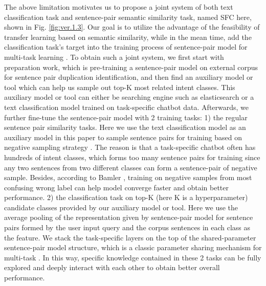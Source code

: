 \documentclass[letterpaper]{article} %
\begin{document}
  The  above  limitation  motivates  us  to  propose a joint system of both text
  classification  task  and  sentence-pair  semantic  similarity task, named SFC
  here, shown in Fig. \ref{fig:ver.1.3}. Our goal is to utilize the advantage of
  the  feasibility  of  transfer learning based on semantic similarity, while in
  the  mean time, add the classification task's target into the training process
  of            sentence-pair           model           for           multi-task
  learning \cite{caruana1993multitask,collobert2008unified}.  To  obtain  such  a
  joint  system,  we  first start with preparation work, which is pre-training a
  sentence-pair   model   on  external  corpus  for  sentence  pair  duplication
  identification,  and  then  find  an auxiliary model or tool which can help us
  sample out top-K most related intent classes. This auxiliary model or tool can
  either  be searching engine such as elasticsearch \cite{divya2013elasticsearch}
  or  a  text  classification  model  trained  on  task-specific  chatbot  data.
  Afterwards,  we  further  fine-tune  the  sentence-pair  model with 2 training
  tasks:  1)  the  regular  sentence pair similarity tasks. Here we use the text
  classification  model  as  an auxiliary model in this paper to sample sentence
  pairs       for       training       based      on      negative      sampling
  strategy \cite{bamler2020extreme}.  The  reason is that a task-specific chatbot
  often  has hundreds of intent classes, which forms too many sentence pairs for
  training  since  any  two  sentences  from  two  different  classes can form a
  sentence-pair     of     negative     sample.     Besides,     according    to
  Bamler \cite{bamler2020extreme},   training   on  negative  samples  from  most
  confusing  wrong  label  can  help  model  converge  faster  and obtain better
  performance.  2) the classification task on top-K (here K is a hyperparameter)
  candidate  classes  provided  by  our auxiliary model or tool. Here we use the
  average  pooling  of  the  representation  given  by  sentence-pair  model for
  sentence pairs formed by the user input query and the corpus sentences in each
  class  as  the  feature.  We  stack the task-specific layers on the top of the
  shared-parameter  sentence-pair  model structure, which is a classic parameter
  sharing                                   mechanism \cite{collobert2008unified,
  subramanian2018learning,liu2019multi}   for  multi-task \cite{sun2019fine}.  In
  this  way, specific knowledge contained in these 2 tasks can be fully explored
  and deeply interact with each other to obtain better overall performance.
\end{document}
